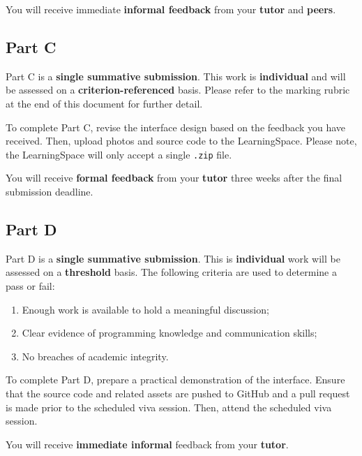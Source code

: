 \documentclass{../fal_assignment}
\begin{document}
You will receive immediate \textbf{informal feedback} from your \textbf{tutor} and \textbf{peers}.

\subsection*{Part C}

Part C is a \textbf{single summative submission}. This work is \textbf{individual} and will be assessed on a \textbf{criterion-referenced} basis. Please refer to the marking rubric at the end of this document for further detail.

To complete Part C, revise the interface design based on the feedback you have received. Then, upload photos and source code to the LearningSpace. Please note, the LearningSpace will only accept a single \texttt{.zip} file.

You will receive \textbf{formal feedback} from your \textbf{tutor} three weeks after the final submission deadline.

\subsection*{Part D}

Part D is a \textbf{single summative submission}. This is \textbf{individual} work will be assessed on a \textbf{threshold} basis. The following criteria are used to determine a pass or fail: 

\begin{enumerate}[label=(\alph*)]
	\item Enough work is available to hold a meaningful discussion; 
	\item Clear evidence of programming knowledge and communication skills; 
	\item No breaches of academic integrity. 
\end{enumerate}

To complete Part D, prepare a practical demonstration of the interface. Ensure that the source code and related assets are pushed to GitHub and a pull request is made prior to the scheduled viva session. Then, attend the scheduled viva session. 

You will receive \textbf{immediate informal} feedback from your \textbf{tutor}.
\end{document}
